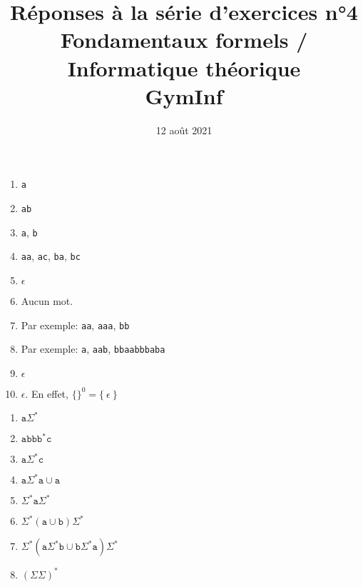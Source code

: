\documentclass[12pt,french,a4paper]{article}
\begin{document}
\title{\vspace{-2cm}Réponses à la série d'exercices n°4\\\large{Fondamentaux formels / Informatique théorique\\GymInf}}
\date{\vspace{-1cm}12 août 2021}

\maketitle

\begin{question}
\begin{enumerate}
\item \texttt{a}
\item \texttt{ab}
\item \texttt{a}, \texttt{b}
\item \texttt{aa}, \texttt{ac}, \texttt{ba}, \texttt{bc}
\item $\epsilon$
\item Aucun mot.
\item Par exemple: \texttt{aa}, \texttt{aaa}, \texttt{bb}
\item Par exemple: \texttt{a}, \texttt{aab}, \texttt{bbaabbbaba}
\item $\epsilon$
\item $\epsilon$. En effet, $\{\}^0 = \{\ \epsilon\ \}$
\end{enumerate}
\end{question}


\begin{question}
\begin{enumerate}
\item $\texttt{a}\Sigma^{*}$
\item $\texttt{abbb}^{*}\texttt{c}$
\item $\texttt{a}\Sigma^{*}\texttt{c}$
\item $\texttt{a}\Sigma^{*}\texttt{a} \cup \texttt{a}$
\item $\Sigma^{*}\texttt{a}\Sigma^{*}$
\item $\Sigma^{*}(\texttt{a}\cup\texttt{b})\Sigma^{*}$
\item $\Sigma^{*}(\texttt{a}\Sigma^{*}\texttt{b} \cup \texttt{b}\Sigma^{*} \texttt{a})\Sigma^{*}$
\item $(\Sigma\Sigma)^{*}$
\end{enumerate}
\end{question}
\end{document}
